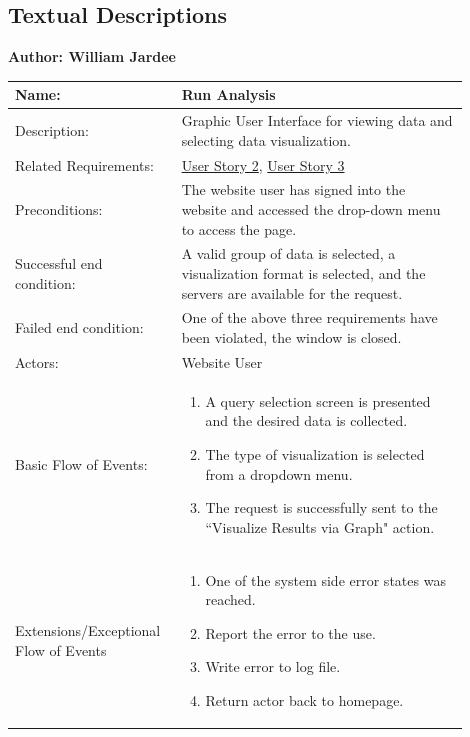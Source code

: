 \documentclass[11pt]{article}
\begin{document}
\subsection{Textual Descriptions}

\begin{table}[!ht]
\begin{center}
\textbf{Author: William Jardee}
\vspace*{1em}

\begin{tabular}{p{0.30\linewidth}p{0.60\linewidth}}
	Name: & Run Analysis\\\hline
	Description: & Graphic User Interface for viewing data and selecting data visualization.\\\hline
	Related Requirements:& \hyperlink{us2}{User Story 2}, \hyperlink{us3}{User Story 3}\\\hline
	Preconditions:& The website user has signed into the website and accessed the drop-down menu to access the page. \\\hline
	Successful end condition:& A valid group of data is selected, a visualization format is selected, and the servers are available for the request.\\\hline
	Failed end condition:& One of the above three requirements have been violated, the window is closed.\\\hline
	Actors:& Website User\\\hline
	Basic Flow of Events: & \begin{enumerate}
	\item A query selection screen is presented and the desired data is collected.
	\item The type of visualization is selected from a dropdown menu.
	\item The request is successfully sent to the ``Visualize Results via Graph" action.
	\end{enumerate}\\\hline
	Extensions/Exceptional Flow of Events & \begin{enumerate}
	\item One of the system side error states was reached.
	\item Report the error to the use.
	\item Write error to log file.
	\item Return actor back to homepage.
	\end{enumerate}
\end{tabular}
\label{des:run_anal}	
\end{center}
\end{table}
\end{document}
